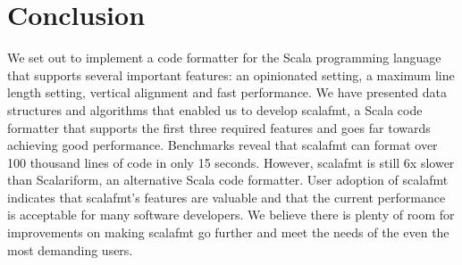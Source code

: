 
\section{Conclusion}
We set out to implement a code formatter for the Scala programming language that supports several important features: an opinionated setting, a maximum line length setting, vertical alignment and fast performance.
We have presented data structures and algorithms that enabled us to develop scalafmt, a Scala code formatter that supports the first three required features and goes far towards achieving good performance.
Benchmarks reveal that scalafmt can format over 100 thousand lines of code in only 15 seconds.
However, scalafmt is still 6x slower than Scalariform, an alternative Scala code formatter.
User adoption of scalafmt indicates that scalafmt's features are valuable and that the current performance is acceptable for many software developers.
We believe there is plenty of room for improvements on making scalafmt go further and meet the needs of the even the most demanding users.
